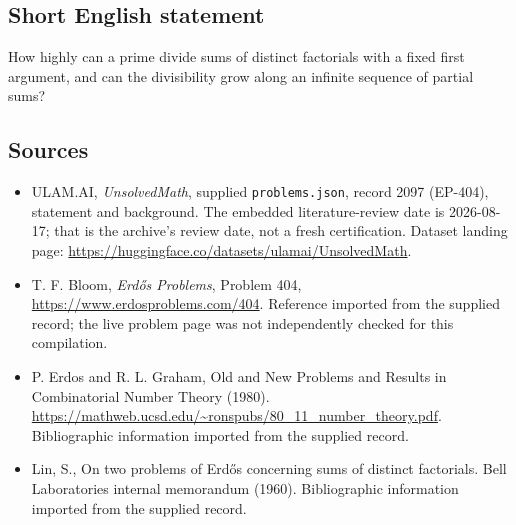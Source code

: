 \documentclass[11pt,a4paper]{article}
\begin{document}
\subsection{Short English statement}

How highly can a prime divide sums of distinct factorials with a fixed first argument, and can the divisibility grow along an infinite sequence of partial sums?

\subsection{Sources}

{\small

\begin{itemize}

\item[\hypertarget{source:2097:1}{S1}] ULAM.AI, \emph{UnsolvedMath}, supplied \texttt{problems.json}, record 2097 (EP-404), statement and background. The embedded literature-review date is 2026-08-17; that is the archive’s review date, not a fresh certification. Dataset landing page: \url{https://huggingface.co/datasets/ulamai/UnsolvedMath}.

\item[\hypertarget{source:2097:2}{S2}] T. F. Bloom, \emph{Erdős Problems}, Problem 404, \url{https://www.erdosproblems.com/404}. Reference imported from the supplied record; the live problem page was not independently checked for this compilation.

\item[\hypertarget{source:2097:3}{S3}] P. Erdos and R. L. Graham, Old and New Problems and Results in Combinatorial Number Theory (1980). \url{https://mathweb.ucsd.edu/~ronspubs/80_11_number_theory.pdf}. Bibliographic information imported from the supplied record.

\item[\hypertarget{source:2097:4}{S4}] Lin, S., On two problems of Erd\H{o}s concerning sums of distinct factorials. Bell Laboratories internal memorandum (1960). Bibliographic information imported from the supplied record.

\end{itemize}

}

\label{end:2097}
\end{document}
